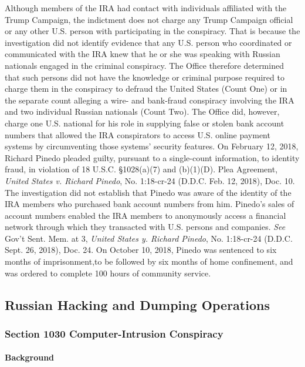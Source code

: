 Although members of the IRA had contact with individuals affiliated with the Trump Campaign, the indictment does not charge any Trump Campaign official or any other U.S. person with participating in the conspiracy.
That is because the investigation did not identify evidence that any U.S. person who coordinated or communicated with the IRA knew that he or she was speaking with Russian nationals engaged in the criminal conspiracy.
The Office therefore determined that such persons did not have the knowledge or criminal purpose required to charge them in the conspiracy to defraud the United States (Count One) or in the separate count alleging a wire- and bank-fraud conspiracy involving the IRA and two individual Russian nationals (Count Two).
The Office did, however, charge one U.S. national for his role in supplying false or stolen bank account numbers that allowed the IRA conspirators to access U.S. online payment systems by circumventing those systems' security features.
On February 12, 2018, Richard Pinedo pleaded guilty, pursuant to a single-count information, to identity fraud, in violation of 18 U.S.C. \S 1028(a)(7) and (b)(1)(D).
Plea Agreement, \textit{United States v. Richard Pinedo}, No. 1:18-cr-24 (D.D.C. Feb. 12, 2018), Doc. 10.
The investigation did not establish that Pinedo was aware of the identity of the IRA members who purchased bank account numbers from him.
Pinedo's sales of account numbers enabled the IRA members to anonymously access a financial network through which they transacted with U.S. persons and companies.
\textit{See} Gov't Sent. Mem. at 3, \textit{United States y. Richard Pinedo}, No. 1:18-cr-24 (D.D.C. Sept. 26, 2018), Doc. 24.
On October 10, 2018, Pinedo was sentenced to six months of imprisonment,to be followed by six months of home confinement, and was ordered to complete 100 hours of community service.

\subsection{Russian Hacking and Dumping Operations}

\subsubsection{Section 1030 Computer-Intrusion Conspiracy}

\paragraph{Background}

